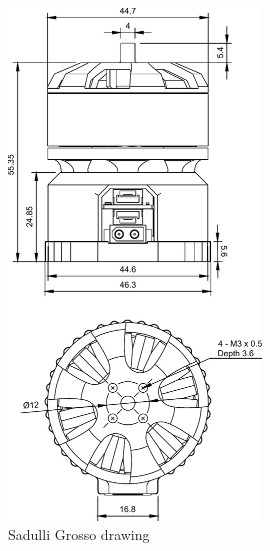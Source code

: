 \begin{figure}[!hbt]
    \centerline{\includegraphics[width=0.6\textwidth]{figures/sadulli_grosso}}
    \caption{Sadulli Grosso drawing\label{Grosso_drawing}}
\end{figure}
